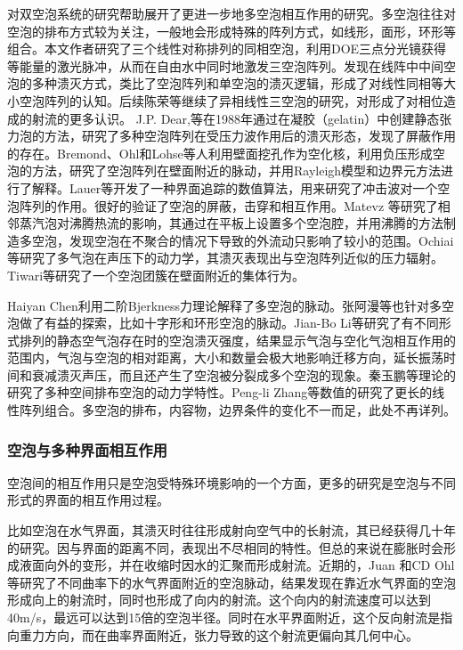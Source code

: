 对双空泡系统的研究帮助展开了更进一步地多空泡相互作用的研究\cite{prigogine_experimental_2007}。多空泡往往对空泡的排布方式较为关注，一般地会形成特殊的阵列方式，如线形，面形，环形等组合。本文作者研究了三个线性对称排列的同相空泡，利用DOE三点分光镜获得等能量的激光脉冲，从而在自由水中同时地激发三空泡阵列。发现在线阵中中间空泡的多种溃灭方式，类比了空泡阵列和单空泡的溃灭逻辑，形成了对线性同相等大小空泡阵列的认知\cite{bao_experimental_2021}。后续陈荣等继续了异相线性三空泡的研究，对形成了对相位造成的射流的更多认识\cite{chen_experimental_2022}。
J.P. Dear,等在1988年通过在凝胶（gelatin）中创建静态张力泡的方法，研究了多种空泡阵列在受压力波作用后的溃灭形态，发现了屏蔽作用的存在\cite{Dear1988a,dear_study_1988}。Bremond、Ohl和Lohse等人利用壁面挖孔作为空化核，利用负压形成空泡的方法，研究了空泡阵列在壁面附近的脉动，并用Rayleigh模型和边界元方法进行了解释\cite{bremond_interaction_2006,bremond_controlled_2006}。Lauer等开发了一种界面追踪的数值算法，用来研究了冲击波对一个空泡阵列的作用。很好的验证了空泡的屏蔽，击穿和相互作用\cite{lauer_numerical_2012}。Matevz 等研究了相邻蒸汽泡对沸腾热流的影响，其通过在平板上设置多个空泡腔，并用沸腾的方法制造多空泡，发现空泡在不聚合的情况下导致的外流动只影响了较小的范围\cite{takeyama_influence_2021}。Ochiai等研究了多气泡在声压下的动力学，其溃灭表现出与空泡阵列近似的压力辐射\cite{ochiai_numerical_2017}。Tiwari等研究了一个空泡团簇在壁面附近的集体行为\cite{tiwari_growth-and-collapse_2015}。

Haiyan Chen利用二阶Bjerkness力理论解释了多空泡的脉动\cite{chen_modulation_2020}。张阿漫等也针对多空泡做了有益的探索，比如十字形和环形空泡的脉动\cite{zhang_interactions_2023}。Jian-Bo Li等研究了有不同形式排列的静态空气泡存在时的空泡溃灭强度，结果显示气泡与空化气泡相互作用的范围内，气泡与空泡的相对距离，大小和数量会极大地影响迁移方向，延长振荡时间和衰减溃灭声压，而且还产生了空泡被分裂成多个空泡的现象\cite{li_influence_2021}。秦玉鹏等理论的研究了多种空间排布空泡的动力学特性\cite{qin_analytical_2022}。Peng-li Zhang等数值的研究了更长的线性阵列组合\cite{zhang_study_2019}。多空泡的排布，内容物，边界条件的变化不一而足，此处不再详列。
\medskip
\bigskip
\subsubsection{空泡与多种界面相互作用}

空泡间的相互作用只是空泡受特殊环境影响的一个方面，更多的研究是空泡与不同形式的界面的相互作用过程\cite{Prosperetti2017,lohse_bubble_2018,lauterborn_physics_2010}。

比如空泡在水气界面，其溃灭时往往形成射向空气中的长射流，其已经获得几十年的研究\cite{boulton-stone_gas_1993,krishnan_scaling_2017,deike_dynamics_2018,e2863fbdabad074393d8ced60bcea666015f76db,6eb937979b9271fc82586961a0a59db1a3bac47c,li_bubble_2019,03a7e1892c909c181fa4619ef2eb9ea70084e02f}。因与界面的距离不同，表现出不尽相同的特性。但总的来说在膨胀时会形成液面向外的变形，并在收缩时因水的汇聚而形成射流。近期的，Juan 和CD Ohl等研究了不同曲率下的水气界面附近的空泡脉动，结果发现在靠近水气界面的空泡形成向上的射流时，同时也形成了向内的射流。这个向内的射流速度可以达到40m/s，最远可以达到15倍的空泡半径\cite{rossello_dynamics_2022}。同时在水平界面附近，这个反向射流是指向重力方向，而在曲率界面附近，张力导致的这个射流更偏向其几何中心。

